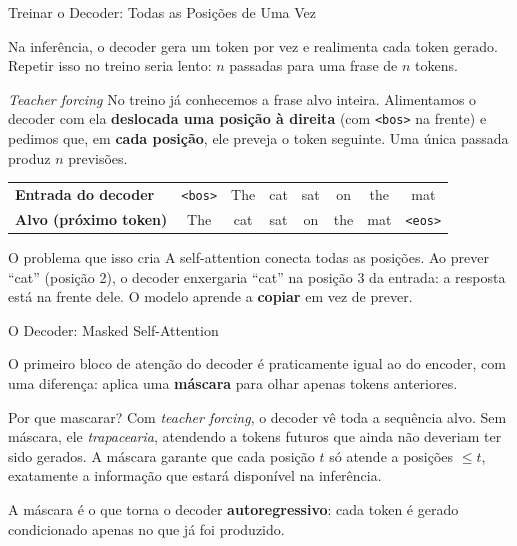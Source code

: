 \documentclass[aspectratio=169,xcolor=dvipsnames]{beamer}
\begin{document}
\begin{frame}{Treinar o Decoder: Todas as Posições de Uma Vez}

Na inferência, o decoder gera um token por vez e realimenta cada token gerado. Repetir isso no treino seria lento: $n$ passadas para uma frase de $n$ tokens.

\begin{block}{\textit{Teacher forcing}}
No treino já conhecemos a frase alvo inteira. Alimentamos o decoder com ela \textbf{deslocada uma posição à direita} (com \texttt{<bos>} na frente) e pedimos que, em \textbf{cada posição}, ele preveja o token seguinte. Uma única passada produz $n$ previsões.
\end{block}

\begin{center}
\renewcommand{\arraystretch}{1.2}
\begin{tabular}{l|ccccccc}
\textbf{Entrada do decoder} & \texttt{<bos>} & The & cat & sat & on & the & mat \\
\textbf{Alvo (próximo token)} & The & cat & sat & on & the & mat & \texttt{<eos>} \\
\end{tabular}
\end{center}

\begin{alertblock}{O problema que isso cria}
A self-attention conecta todas as posições. Ao prever ``cat'' (posição 2), o decoder enxergaria ``cat'' na posição 3 da entrada: a resposta está na frente dele. O modelo aprende a \textbf{copiar} em vez de prever.
\end{alertblock}

\end{frame}


\begin{frame}{O Decoder: Masked Self-Attention}

O primeiro bloco de atenção do decoder é praticamente igual ao do encoder, com uma diferença: aplica uma \textbf{máscara} para olhar apenas tokens anteriores.

\vspace{6pt}

\begin{block}{Por que mascarar?}
Com \textit{teacher forcing}, o decoder vê toda a sequência alvo. Sem máscara, ele \textit{trapacearia}, atendendo a tokens futuros que ainda não deveriam ter sido gerados. A máscara garante que cada posição $t$ só atende a posições $\leq t$, exatamente a informação que estará disponível na inferência.
\end{block}

\vspace{8pt}

\centering
A máscara é o que torna o decoder \textbf{autoregressivo}: cada token é gerado condicionado apenas no que já foi produzido.

\end{frame}
\end{document}

